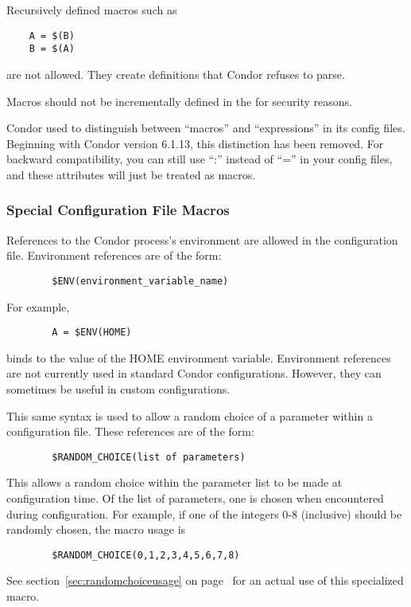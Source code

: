 Recursively defined macros such as
\begin{verbatim}
    A = $(B)
    B = $(A)
\end{verbatim}
are not allowed.
They create definitions that Condor refuses to parse. 

\Note Macros should not be incrementally defined in the
 for security reasons.

\Note Condor used to distinguish between ``macros'' and ``expressions''
in its config files.
Beginning with Condor version 6.1.13, this distinction has been
removed.
For backward compatibility, you can still use ``:'' instead of ``=''
in your config files, and these attributes will just be treated as
macros.

\subsubsection{\label{sec:Config-File-Special}
Special Configuration File Macros}

References to the Condor process's environment are allowed in the
configuration file.
Environment references are of the form:
\begin{verbatim}
        $ENV(environment_variable_name)
\end{verbatim}
For example, 
\begin{verbatim}
        A = $ENV(HOME)
\end{verbatim}
binds  to the value of the HOME environment variable.
Environment references are not currently used in standard Condor
configurations.
However, they can sometimes be useful in custom configurations.

This same syntax is used to allow a random choice of a parameter
within a configuration file.
These references are of the form:
\begin{verbatim}
        $RANDOM_CHOICE(list of parameters)
\end{verbatim}
This allows a random choice within the parameter list to be made
at configuration time.  Of the list of parameters, one is
chosen when encountered during configuration.  For example,
if one of the integers 0-8 (inclusive) should be randomly
chosen, the macro usage is
\begin{verbatim}
        $RANDOM_CHOICE(0,1,2,3,4,5,6,7,8)
\end{verbatim}
  See section~\ref{sec:randomchoiceusage} on
  page~\pageref{sec:randomchoiceusage}
  for an actual use of this specialized macro.

